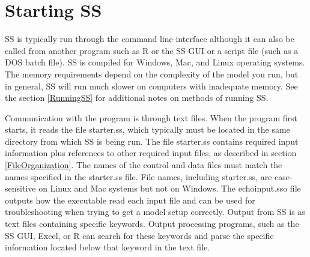\section{Starting SS}
SS is typically run through the command line interface although it can also be called from another program such as R or the SS-GUI or a script file (such as a DOS batch file). SS is compiled for Windows, Mac, and Linux operating systems. The memory requirements depend on the complexity of the model you run, but in general, SS will run much slower on computers with inadequate memory. See the section \ref{RunningSS} for additional notes on methods of running SS.

Communication with the program is through text files.  When the program first starts, it reads the file starter.ss, which typically must be located in the same directory from which SS is being run.  The file starter.ss contains required input information plus references to other required input files, as described in section \ref{FileOrganization}.  The names of the control and data files must match the names specified in the starter.ss file.  File names, including starter.ss, are case-sensitive on Linux and Mac systems but not on Windows. The echoinput.sso file outputs how the executable read each input file and can be used for troubleshooting when trying to get a model setup correctly.  Output from SS is as text files containing specific keywords.  Output processing programs, such as the SS GUI, Excel, or R can search for these keywords and parse the specific information located below that keyword in the text file.

